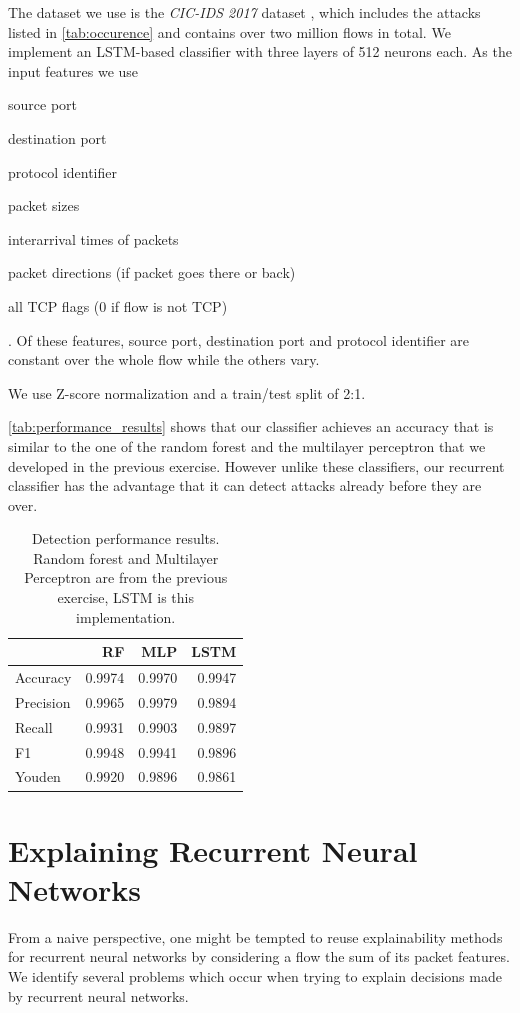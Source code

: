 \documentclass[conference]{IEEEtran}
\begin{document}
The dataset we use is the \textit{CIC-IDS 2017} dataset \cite{sharafaldin_toward_2018}, which includes the attacks listed in \autoref{tab:occurence} and contains over two million flows in total. We implement an LSTM-based classifier with three layers of 512 neurons each. As the input features we use \begin{itemize*}
\item source port
\item destination port
\item protocol identifier
\item packet sizes
\item interarrival times of packets
\item packet directions (if packet goes there or back)
\item all TCP flags (0 if flow is not TCP)
\end{itemize*}. Of these features, source port, destination port and protocol identifier are constant over the whole flow while the others vary.

We use Z-score normalization and a train/test split of 2:1.

\autoref{tab:performance_results} shows that our classifier achieves an accuracy that is similar to the one of the random forest and the multilayer perceptron that we developed in the previous exercise. However unlike these classifiers, our recurrent classifier has the advantage that it can detect attacks already before they are over.

\begin{table}
\caption{Detection performance results. Random forest and Multilayer Perceptron are from the previous exercise, LSTM is this implementation.} \label{tab:performance_results}
\centering
\begin{tabular}{l r r r} \toprule
& RF & MLP & LSTM \\ \midrule
Accuracy	&	0.9974 & 0.9970	& 0.9947 \\
Precision	&	0.9965 & 0.9979 & 0.9894	\\
Recall	&	0.9931 & 0.9903	& 0.9897 \\
F1	&	0.9948 & 0.9941	& 0.9896 \\
Youden	&	0.9920 & 0.9896 & 0.9861 \\
\bottomrule
\end{tabular}
\end{table}
\section{Explaining Recurrent Neural Networks}
From a naive perspective, one might be tempted to reuse explainability methods for recurrent neural networks by considering a flow the sum of its packet features.
We identify several problems which occur when trying to explain decisions made by recurrent neural networks.
\end{document}
